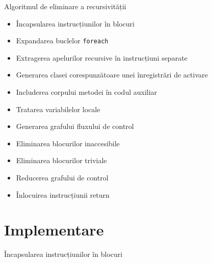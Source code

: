 \documentclass{beamer}
\def\code#1{\texttt{#1}}
\begin{document}
\begin{frame}{Algoritmul de eliminare a recursivității}
    \begin{itemize}
        \item Încapsularea instrucțiunilor în blocuri
        \item Expandarea buclelor \code{foreach}
        \item Extragerea apelurilor recursive în instrucțiuni separate
        \item Generarea clasei corespunzătoare unei înregistrări de activare
        \item Includerea corpului metodei în codul auxiliar
        \item Tratarea variabilelor locale
        \item Generarea grafului fluxului de control
        \item Eliminarea blocurilor inaccesibile
        \item Eliminarea blocurilor triviale
        \item Reducerea grafului de control
        \item Înlocuirea instrucțiunii return
    \end{itemize}
\end{frame}

\section{Implementare}

\begin{frame}{Încapsularea instrucțiunilor în blocuri}
    \begin{figure}[htb]
        \\
    \end{figure}
\end{frame}
\end{document}
